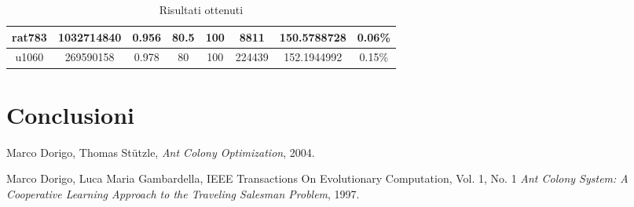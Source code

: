 \documentclass{article}
\begin{document}
\begin{table}[h]
\begin{tabular}{|c|c|c|c|c|c|c|c|}
        rat783           & 1032714840    & 0.956             & 80.5                          & 100          & 8811            & 150.5788728   & 0.06\%                      \\\hline                                                        %
        u1060            & 269590158     & 0.978             & 80                            & 100          & 224439          & 152.1944992   & 0.15\%                      \\\hline
    \end{tabular}
    \caption{Risultati ottenuti}
\end{table}

\section{Conclusioni}

\pagebreak
\begin{thebibliography}{9}
    Marco Dorigo, Thomas Stützle,
    \textit{Ant Colony Optimization}, 2004.

    Marco Dorigo, Luca Maria Gambardella,
    IEEE Transactions On Evolutionary Computation, Vol. 1, No. 1
    \textit{Ant Colony System: A Cooperative Learning Approach to the Traveling Salesman Problem},
    1997.
\end{thebibliography}
\end{document}
